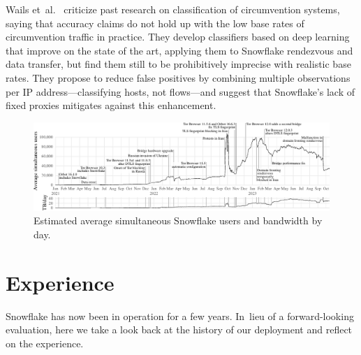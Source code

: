 \documentclass[letterpaper,twocolumn]{article}
\begin{document}
Wails et~al.~\cite{Wails2024a}
criticize past research on classification of circumvention systems,
saying that accuracy claims do not hold up
with the low base rates of circumvention traffic in practice.
They develop classifiers based on deep learning
that improve on the state of the art,
applying them to Snowflake rendezvous and data transfer,
but find them still to be prohibitively imprecise with realistic base rates.
They propose to reduce false positives by combining
multiple observations per IP address---classifying hosts,
not flows---and suggest that Snowflake's lack of
fixed proxies mitigates against this enhancement.

\begin{figure}[t]
\includegraphics{figures/users/users-global}
\caption{
Estimated average simultaneous Snowflake users and bandwidth by day.
}
\label{fig:client-counts}
\end{figure}

\section{Experience}
\label{sec:experience}

Snowflake has now been in operation for a few years.
In~lieu of a forward-looking evaluation,
here we take a look back
at the history of our deployment
and reflect on the experience.
\end{document}
